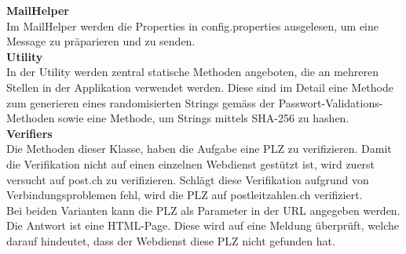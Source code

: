 \documentclass[12pt]{scrartcl}
\begin{document}
\textbf{MailHelper}\\
Im MailHelper werden die Properties in config.properties ausgelesen, um eine Message zu präparieren und zu senden.\\

\textbf{Utility}\\
In der Utility werden zentral statische Methoden angeboten, die an mehreren Stellen in der Applikation verwendet werden. Diese sind im Detail eine Methode zum generieren eines randomisierten Strings gemäss der Passwort-Validations-Methoden sowie eine Methode, um Strings mittels SHA-256 zu hashen.\\

\textbf{Verifiers}\\
Die Methoden dieser Klasse, haben die Aufgabe eine PLZ zu verifizieren. Damit die Verifikation nicht auf einen einzelnen Webdienst gestützt ist, wird zuerst versucht auf post.ch zu verifizieren. Schlägt diese Verifikation aufgrund von Verbindungsproblemen fehl, wird die PLZ auf postleitzahlen.ch verifiziert.\\
Bei beiden Varianten kann die PLZ als Parameter in der URL angegeben werden. Die Antwort ist eine HTML-Page. Diese wird auf eine Meldung überprüft, welche darauf hindeutet, dass der Webdienst diese PLZ nicht gefunden hat.

 
\end{document}
